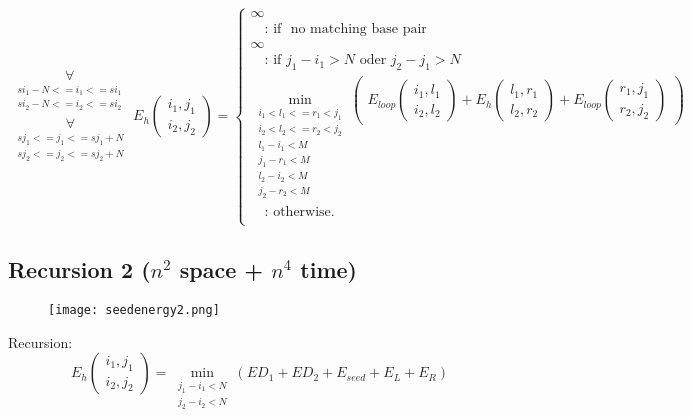 \begin{equation*}
\substack{
  \underset{\substack{si_{1}-N <= i_{1} <= si_{1}\\si_{2}-N <= i_{2} <= si_{2}}}{\forall}\\
  \underset{\substack{sj_{1} <= j_{1} <= sj_{1}+N\\sj_{2} <= j_{2} <= sj_{2}+N}}{\forall}
}
E_h(\substack{i_1,j_1\\i_2,j_2}) = \begin{cases}
  \infty\\
  \quad\text{: if } \text{ no matching base pair }\\
  \infty\\
  \quad\text{: if } j_{1} - i_{1} > N \text{ oder } j_{2} - j_{1} > N\\
  \min\limits_{\substack{i_{1} < l_{1} <= r_{1} < j_{1}\\i_{2} < l_{2} <= r_{2} < j_{2}\\l_{1} - i_{1} < M\\j_{1}-r_{1} < M\\l_{2} - i_{2} < M\\j_{2}-r_{2} < M}}
  \begin{pmatrix}
	E_{loop}(\substack{i_1,l_1\\i_2,l_2}) + E_h(\substack{l_1,r_1\\l_2,r_2}) + E_{loop}(\substack{r_1,j_1\\r_2,j_2})
  \end{pmatrix}\\
  \quad\text{: otherwise.}\\
  
\end{cases}
\end{equation*}

\clearpage

\subsection{Recursion 2 ($n^{2}$ space + $n^{4}$ time)}

\begin{figure}[H]
	\centering
	\texttt{[image: seedenergy2.png]}
\end{figure}

Recursion:\\

\begin{equation*}
E_h(\substack{i_1,j_1\\i_2,j_2}) = \underset{\substack{j_{1} - i_{1} < N\\j_{2} - i_{2} < N}}{\min}(ED_{1} + ED_{2} + E_{seed} + E_{L} + E_{R})
\end{equation*}

